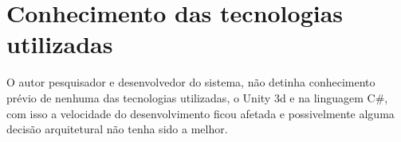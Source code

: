 \section{Conhecimento das tecnologias utilizadas}\label{pro:conhecimento}
  O autor pesquisador e desenvolvedor do sistema, não detinha conhecimento prévio de nenhuma das
tecnologias utilizadas, o Unity 3d e na linguagem C\#, com isso a velocidade do desenvolvimento ficou afetada
e possivelmente alguma decisão arquitetural não tenha sido a melhor.
